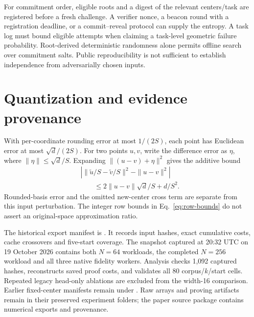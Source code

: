 For commitment order, eligible roots and a digest of the relevant centers/task are registered before a fresh challenge. A verifier nonce, a beacon round with a registration deadline, or a commit--reveal protocol can supply the entropy. A task log must bound eligible attempts when claiming a task-level geometric failure probability. Root-derived deterministic randomness alone permits offline search over commitment salts. Public reproducibility is not sufficient to establish independence from adversarially chosen inputs.

\section{Quantization and evidence provenance}\label{app:configurations}
With per-coordinate rounding error at most $1/(2S)$, each point has Euclidean error at most $\sqrt d/(2S)$. For two points $u,v$, write the difference error as $\eta$, where $\|\eta\|\le\sqrt d/S$. Expanding $\|(u-v)+\eta\|^2$ gives the additive bound
\begin{equation}
\begin{aligned}
&\left|\|\widetilde u/S-\widetilde v/S\|^2-\|u-v\|^2\right|\\
&\qquad\le2\|u-v\|\sqrt d/S+d/S^2.
\end{aligned}
\end{equation}
Rounded-basis error and the omitted new-center cross term are separate from this input perturbation. The integer row bounds in Eq.~\eqref{eq:row-bounds} do not assert an original-space approximation ratio.

The historical export manifest is . It records input hashes, exact cumulative costs, cache crossovers and five-start coverage. The snapshot captured at 20:32 UTC on 19 October 2026 contains both $N=64$ workloads, the completed $N=256$ workload and all three native fidelity workers. Analysis checks 1,092 captured hashes, reconstructs saved proof costs, and validates all 80 corpus/$k$/start cells. Repeated legacy head-only ablations are excluded from the width-16 comparison. Earlier fixed-center manifests remain under . Raw arrays and proving artifacts remain in their preserved experiment folders; the paper source package contains numerical exports and provenance.

